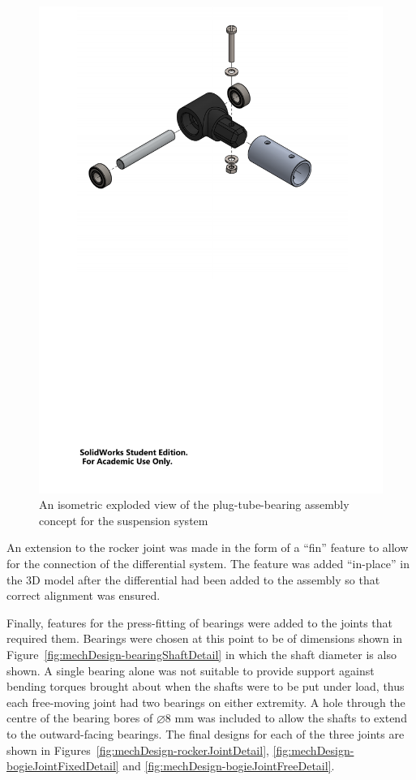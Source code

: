         \begin{figure}[h!]
          \centering
          \includegraphics[clip, trim=2cm 17cm 2cm 1cm, width=0.8\linewidth]{figures/plug-tube-bearing}
          \caption[An isometric exploded view of the plug-tube-bearing assembly concept for the suspension system]{An isometric exploded view of the plug-tube-bearing assembly concept for the suspension system}
          \label{fig:mechDesign-plugTubeBearingDetail}
        \end{figure}        
        
        An extension to the rocker joint was made in the form of a ``fin'' feature to allow for the connection of the differential system. The feature was added ``in-place'' in the 3D model after the differential had been added to the assembly so that correct alignment was ensured.
        
        Finally, features for the press-fitting of bearings were added to the joints that required them. Bearings were chosen at this point to be of dimensions shown in Figure~\ref{fig:mechDesign-bearingShaftDetail} in which the shaft diameter is also shown. A single bearing alone was not suitable to provide support against bending torques brought about when the shafts were to be put under load, thus each free-moving joint had two bearings on either extremity. A hole through the centre of the bearing bores of $\diameter8$ mm was included to allow the shafts to extend to the outward-facing bearings. The final designs for each of the three joints are shown in Figures~\ref{fig:mechDesign-rockerJointDetail}, \ref{fig:mechDesign-bogieJointFixedDetail} and \ref{fig:mechDesign-bogieJointFreeDetail}.
        
